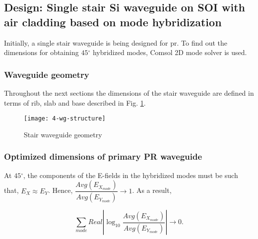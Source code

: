 \documentclass[../report.tex]{subfiles}
\begin{document}
		\subsection{Design: Single stair Si waveguide on SOI with air cladding based on mode hybridization}
Initially, a single stair waveguide is being designed for \gls{pr}. To find out the dimensions for obtaining $45{^\circ}$ hybridized modes, Comsol 2D mode solver is used. 

\subsubsection{Waveguide geometry}
Throughout the next sections the dimensions of the stair waveguide are defined in terms of rib, slab and base described in Fig. \ref{fig:4_wg_structure}.   

\begin{figure}[H] %
	\centering
	\texttt{[image: 4-wg-structure]}
	\caption{Stair waveguide geometry}
	\label{fig:4_wg_structure}
\end{figure}


\subsubsection{Optimized dimensions of primary PR waveguide}
At $45{^\circ}$, the components of the E-fields in the hybridized modes must be such that, $E_X \approx E_Y$. Hence, $\dfrac {Avg(E_{X_{mode}})} {Avg(E_{Y_{mode}})} \rightarrow 1$. As a result, 

\begin{equation}\label{eq:wg_dim_eq}
\sum _{mode}Real\left| \log _{10}\dfrac {Avg(E_{X_{mode}})} {Avg(E_{Y_{mode}})}\right| \rightarrow 0. 
\end{equation}
\end{document}
